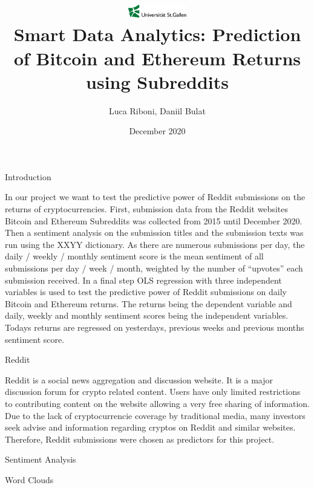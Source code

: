 \documentclass[
  ignorenonframetext,
]{beamer}
\title{\includegraphics[width=1in,height=\textheight]{unisg_logo.jpg}\\
Smart Data Analytics: Prediction of Bitcoin and Ethereum Returns using
Subreddits}
\author{Luca Riboni, Daniil Bulat}
\date{December 2020}
\begin{document}
\frame{\titlepage}

\begin{frame}{Introduction}
\protect\hypertarget{introduction}{}

In our project we want to test the predictive power of Reddit
submissions on the returns of cryptocurrencies. First, submission data
from the Reddit websites Bitcoin and Ethereum Subreddits was collected
from 2015 until December 2020. Then a sentiment analysis on the
submission titles and the submission texts was run using the XXYY
dictionary. As there are numerous submissions per day, the daily /
weekly / monthly sentiment score is the mean sentiment of all
submissions per day / week / month, weighted by the number of
``upvotes'' each submission received. In a final step OLS regression
with three independent variables is used to test the predictive power of
Reddit submissions on daily Bitcoin and Ethereum returns. The returns
being the dependent variable and daily, weekly and monthly sentiment
scores being the independent variables. Todays returns are regressed on
yesterdays, previous weeks and previous months sentiment score.

\end{frame}

\begin{frame}{Reddit}
\protect\hypertarget{reddit}{}

Reddit is a social news aggregation and discussion website. It is a
major discussion forum for crypto related content. Users have only
limited restrictions to contributing content on the website allowing a
very free sharing of information. Due to the lack of cryptocurrencie
coverage by traditional media, many investors seek advise and
information regarding cryptos on Reddit and similar websites. Therefore,
Reddit submissions were chosen as predictors for this project.

\end{frame}

\begin{frame}{Sentiment Analysis}
\protect\hypertarget{sentiment-analysis}{}

\end{frame}

\begin{frame}{Word Clouds}
\protect\hypertarget{word-clouds}{}

\end{frame}
\end{document}
